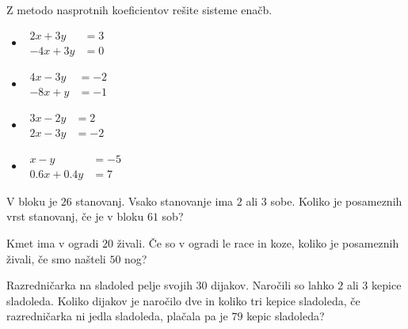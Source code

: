         
            \begin{naloga}
                Z metodo nasprotnih koeficientov rešite sisteme enačb.
                \begin{itemize}
                    
                        \item $\begin{aligned}
                            2x+3y&=3 \\ -4x+3y&=0
                        \end{aligned}$ 
                        \item $\begin{aligned}
                            4x-3y&=-2 \\ -8x+y&=-1
                        \end{aligned}$ 
                        \item $\begin{aligned}
                            3x-2y&=2 \\ 2x-3y&=-2
                        \end{aligned}$ 
                        \item $\begin{aligned}
                            x-y&=-5 \\ 0.6x+0.4y&=7
                        \end{aligned}$ 
                    

                \end{itemize}
            \end{naloga}
        


        
            \begin{naloga}
                V bloku je $26$ stanovanj. Vsako stanovanje ima $2$ ali $3$ sobe. Koliko je posameznih vrst stanovanj, če je v bloku $61$ sob?
                
            \end{naloga}

            \begin{naloga}
                Kmet ima v ogradi $20$  živali. Če so v ogradi le race in koze, koliko je posameznih živali, če smo našteli $50$ nog? 
                
            \end{naloga}

        


        
            \begin{naloga}
                Razredničarka na sladoled pelje svojih $30$ dijakov. Naročili so lahko $2$ ali $3$ kepice sladoleda. Koliko dijakov je naročilo dve in koliko tri kepice sladoleda,
                če razredničarka ni jedla sladoleda, plačala pa je $79$ kepic sladoleda?
                
            \end{naloga}

